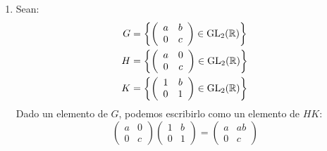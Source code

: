 \begin{ejemplo}
\begin{enumerate}
            Sí es producto interno directo, ya que se verifican:
            \begin{itemize}
                \item $G = HK$.
                \item $G$ es abeliano, luego $H,K\lhd G$.
                \item $H\cap K = \{1\}$.
            \end{itemize}
            Y podemos aplicar el Teorema~\ref{teo:carac_prod_interno}.
        \item Sean:
            \begin{align*}
                G &= \left\{\left(\begin{array}{cc}
                    a & b \\
                    0 & c 
                \end{array}\right) \in \operatorname{GL}_2(\mathbb{R})\right\} \\
                H &= \left\{\left(\begin{array}{cc}
                    a & 0 \\
                    0 & c 
                \end{array}\right)\in \operatorname{GL}_2(\mathbb{R})\right\} \\
                K &= \left\{\left(\begin{array}{cc}
                    1 & b \\
                    0 & 1 
                \end{array}\right) \in \operatorname{GL}_2(\mathbb{R})\right\}
            \end{align*}
            Dado un elemento de $G$, podemos escribirlo como un elemento de $HK$:
            \begin{equation*}
                \left(\begin{array}{cc}
                    a & 0 \\
                    0 & c 
                \end{array}\right)\left(\begin{array}{cc}
                    1 & b \\
                    0 & 1 
                \end{array}\right) = \left(\begin{array}{cc}
                    a & ab \\
                    0 & c 
                \end{array}\right)
            \end{equation*}

\end{enumerate}
\end{ejemplo}

